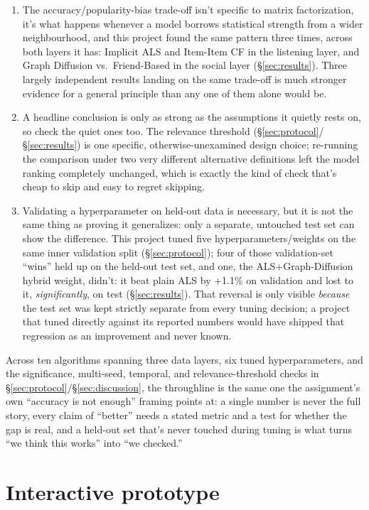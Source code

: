 \documentclass[11pt,a4paper]{article}
\newcommand{\secref}[1]{\S\ref{#1}}
\begin{document}
\begin{enumerate}[leftmargin=*]
  \item The accuracy/popularity-bias trade-off isn't specific to matrix factorization, it's what happens whenever a model borrows statistical strength from a wider neighbourhood, and this project found the same pattern three times, across both layers it has: Implicit ALS and Item-Item CF in the listening layer, and Graph Diffusion vs.\ Friend-Based in the social layer (\secref{sec:results}). Three largely independent results landing on the same trade-off is much stronger evidence for a general principle than any one of them alone would be.
  \item A headline conclusion is only as strong as the assumptions it quietly rests on, so check the quiet ones too. The relevance threshold (\secref{sec:protocol}/\secref{sec:results}) is one specific, otherwise-unexamined design choice; re-running the comparison under two very different alternative definitions left the model ranking completely unchanged, which is exactly the kind of check that's cheap to skip and easy to regret skipping.
  \item Validating a hyperparameter on held-out data is necessary, but it is not the same thing as proving it generalizes: only a separate, untouched test set can show the difference. This project tuned five hyperparameters/weights on the same inner validation split (\secref{sec:protocol}); four of those validation-set ``wins'' held up on the held-out test set, and one, the ALS+Graph-Diffusion hybrid weight, didn't: it beat plain ALS by +1.1\% on validation and lost to it, \emph{significantly}, on test (\secref{sec:results}). That reversal is only visible \emph{because} the test set was kept strictly separate from every tuning decision; a project that tuned directly against its reported numbers would have shipped that regression as an improvement and never known.
\end{enumerate}

Across ten algorithms spanning three data layers, six tuned hyperparameters, and the significance, multi-seed, temporal, and relevance-threshold checks in \secref{sec:protocol}/\secref{sec:discussion}, the throughline is the same one the assignment's own ``accuracy is not enough'' framing points at: a single number is never the full story, every claim of ``better'' needs a stated metric and a test for whether the gap is real, and a held-out set that's never touched during tuning is what turns ``we think this works'' into ``we checked.''

\section{Interactive prototype}
\label{sec:prototype}
\end{document}
